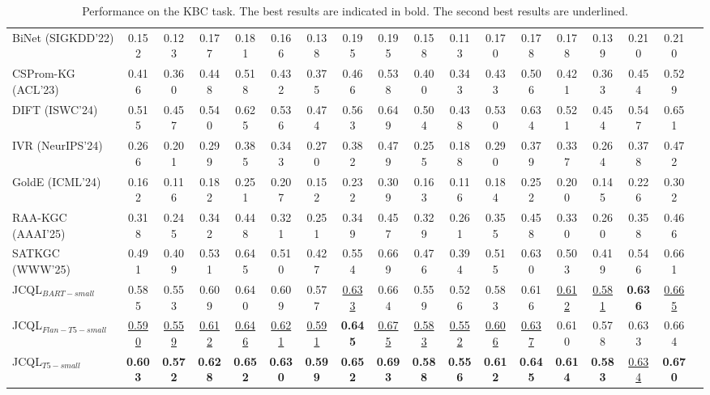 \begin{table}[t!]
{\begin{tabular}{lccccccccccccccccc}
BiNet (SIGKDD'22)          & 0.152 & 0.123 & 0.177 & 0.181  & 0.166 & 0.138 & 0.195 & 0.195  & 0.158  & 0.113 & 0.170 & 0.178 & 0.178 & 0.139 & 0.210 & 0.210 \\ 
CSProm-KG (ACL'23)  & 0.416 & 0.360 & 0.448 & 0.518  & 0.432 & 0.375 & 0.466 & 0.538  & 0.400 & 0.343 & 0.433 & 0.506  & 0.421 & 0.363 & 0.454 & 0.529 \\ 
DIFT (ISWC'24)      & 0.515 & 0.457 & 0.540 & 0.625  & 0.536 & 0.474 & 0.563 & 0.649  & 0.504 & 0.438 & 0.530 & 0.634  & 0.521 & 0.454 & 0.547 & 0.651 \\ 
IVR (NeurIPS'24)     & 0.266 & 0.201   & 0.299 & 0.385  & 0.343 & 0.270 & 0.382 & 0.479  & 0.255 & 0.188 & 0.290 & 0.379  & 0.337 & 0.264 & 0.378 & 0.472 \\
GoldE (ICML'24)               & 0.162 & 0.116   & 0.182 & 0.251  & 0.207 & 0.152 & 0.232 & 0.309  & 0.163 & 0.116 & 0.184 & 0.252  & 0.200 & 0.145 & 0.226 & 0.302 \\
RAA-KGC (AAAI'25)              & 0.318 & 0.245   & 0.342 & 0.448  & 0.321 & 0.251 & 0.349 & 0.457  & 0.329 & 0.261 & 0.355 & 0.458  & 0.330 & 0.260 & 0.358 & 0.466 \\
SATKGC (WWW'25)               &0.491 &0.409 &0.531 &0.645 &0.510 &0.427 &0.554 &0.669 &0.476 &0.394 &0.515 &0.630 &0.503 &0.419 &0.546 &0.661\\

JCQL$_{BART-small}$                 
&0.585 &0.553 &0.609 &0.640
&0.609 &0.577 &\underline{0.633} &0.664  
&0.559 &0.526 &0.583 &0.616
&\underline{0.612} &\underline{0.581} &\textbf{0.636} &\underline{0.665}      \\ 
JCQL$_{Flan-T5-small}$                 
&\underline{0.590} &\underline{0.559} &\underline{0.612} &\underline{0.646}
&\underline{0.621} &\underline{0.591} &\textbf{0.645} &\underline{0.675}  
&\underline{0.583} &\underline{0.552} &\underline{0.606} &\underline{0.637}
&0.610 &0.578 &0.633 &0.664      \\ 
JCQL$_{T5-small}$                 
    & \textbf{0.603} & \textbf{0.572} & \textbf{0.628} & \textbf{0.652} 
    & \textbf{0.630} & \textbf{0.599} & \textbf{0.652} & \textbf{0.693}   
    & \textbf{0.588} & \textbf{0.556} & \textbf{0.612} & \textbf{0.645}  
    & \textbf{0.614} & \textbf{0.583} & \underline{0.634} & \textbf{0.670}
                                      \\ 
\bottomrule
\end{tabular}%
}
\vspace{-1mm}
\caption{Performance on the KBC task. The best results are indicated in bold. The second best results are underlined.}
\label{Knowledge Graph Completion Performance}
\end{table}
\renewcommand{\arraystretch}{1.0}


